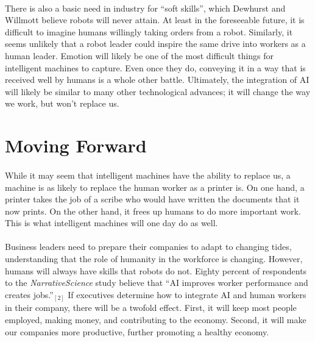 \documentclass{article}
\begin{document}
    \paragraph{}
      There is also a basic need in industry for “soft skills”, which Dewhurst and Willmott
      believe robots will never attain. At least in the foreseeable future, it
      is difficult to imagine humans willingly taking orders from a robot.
      Similarly, it seems unlikely that a robot leader could inspire the same
      drive into workers as a human leader. Emotion will likely be one of the
      most difficult things for intelligent machines to capture. Even once they
      do, conveying it in a way that is received well by humans is a whole other
      battle. Ultimately, the integration of AI will likely be similar to many
      other technological advances; it will change the way we work, but won't
      replace us.

  \section{Moving Forward}
    \paragraph{}
      While it may seem that intelligent machines have the ability to
      replace us, a machine is as likely to replace the human worker as a printer
      is. On one hand, a printer takes the job of a scribe who would have written the
      documents that it now prints. On the other hand, it frees up humans to
      do more important work. This is what intelligent machines will one day
      do as well.

    \paragraph{}
      Business leaders need to prepare their companies to adapt to
      changing tides, understanding that the role of humanity in the workforce
      is changing. However, humans will always have skills that robots do not.
      Eighty percent of respondents to the \textit{NarrativeScience} study believe
      that ``AI improves worker performance and creates jobs.''$_{[2]}$ If
      executives determine how to integrate AI and human workers in their company,
      there will be a twofold effect. First, it will keep
      most people employed, making money, and contributing to the economy.
      Second, it will make our companies more productive, further promoting a healthy
      economy.
\end{document}
